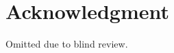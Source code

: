 \documentclass[10pt,conference]{IEEEtran}
\begin{document}
\section*{Acknowledgment}

Omitted due to blind review.

\balance






\end{document}
